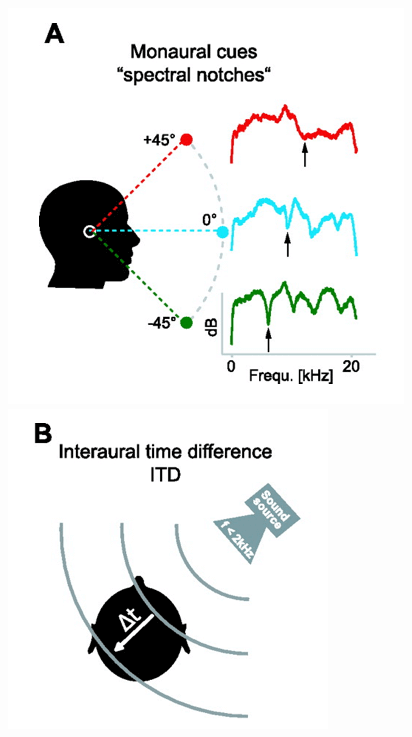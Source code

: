 \documentclass[BTech]{nitkdiss}
\begin{document}
\begin{figure}[h!]
  \centering
  \begin{minipage}[b]{0.3\textwidth}
    \includegraphics[width=\textwidth]{A}
  \end{minipage}
  \hfill
  \begin{minipage}[b]{0.3\textwidth}
    \includegraphics[width=\textwidth]{B}

\end{minipage}
\end{figure}
\end{document}
